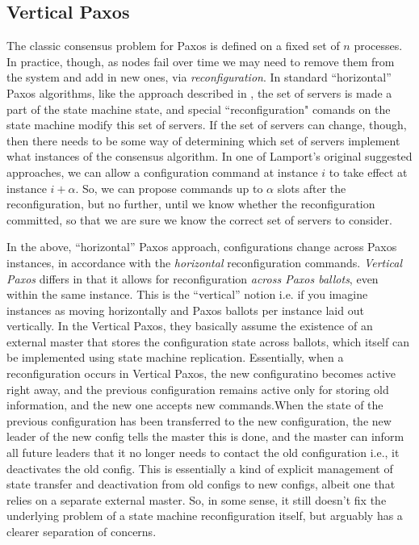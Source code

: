 \documentclass[10pt,a4paper]{article}
\begin{document}
\subsection{Vertical Paxos}

The classic consensus problem for Paxos is defined on a fixed set of $n$ processes. In practice, though, as nodes fail over time we may need to remove them from the system and add in new ones, via \textit{reconfiguration}. In standard ``horizontal'' Paxos algorithms, like the approach described in \cite{lamport2001paxos}, the set of servers is made a part of the state machine state, and special ``reconfiguration" comands on the state machine modify this set of servers. If the set of servers can change, though, then there needs to be some way of determining which set of servers implement what instances of the consensus algorithm. In one of Lamport's original suggested approaches, we can allow a configuration command at instance $i$ to take effect at instance $i + \alpha$. So, we can propose commands up to $\alpha$ slots after the reconfiguration, but no further, until we know whether the reconfiguration committed, so that we are sure we know the correct set of servers to consider. 

In the above, ``horizontal'' Paxos approach, configurations change across Paxos instances, in accordance with the \textit{horizontal} reconfiguration commands. \textit{Vertical Paxos} \cite{lamport2009vertical} differs in that it allows for reconfiguration \textit{across Paxos ballots}, even within the same instance. This is the ``vertical'' notion i.e. if you imagine instances as moving horizontally and Paxos ballots per instance laid out vertically. In the Vertical Paxos, they basically assume the existence of an external master that stores the configuration state across ballots, which itself can be implemented using state machine replication. Essentially, when a reconfiguration occurs in Vertical Paxos, the new configuratino becomes active right away, and the previous configuration remains active only for storing old information, and the new one accepts new commands.When the state of the previous configuration has been transferred to the new configuration, the new leader of the new config tells the master this is done, and the master can inform all future leaders that it no longer needs to contact the old configuration i.e., it deactivates the old config. This is essentially a kind of explicit management of state transfer and deactivation from old configs to new configs, albeit one that relies on a separate external master. So, in some sense, it still doesn't fix the underlying problem of a state machine reconfiguration itself, but arguably has a clearer separation of concerns.
\end{document}
